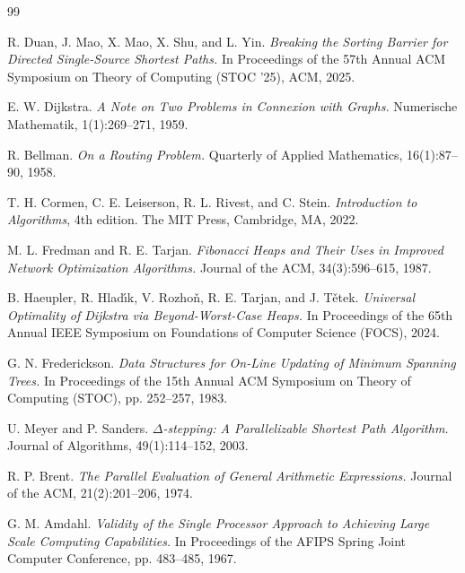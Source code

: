 \documentclass[12pt,a4paper,openany,oneside]{report}
\theoremstyle{plain}
\numberwithin{equation}{section}
\begin{document}
\newpage
{}
\begin{thebibliography}{99}

R. Duan, J. Mao, X. Mao, X. Shu, and L. Yin.
\textit{Breaking the Sorting Barrier for Directed Single-Source Shortest Paths.}
In Proceedings of the 57th Annual ACM Symposium on Theory of Computing (STOC '25), ACM, 2025.

E. W. Dijkstra.
\textit{A Note on Two Problems in Connexion with Graphs.}
Numerische Mathematik, 1(1):269--271, 1959.

R. Bellman.
\textit{On a Routing Problem.}
Quarterly of Applied Mathematics, 16(1):87--90, 1958.

T. H. Cormen, C. E. Leiserson, R. L. Rivest, and C. Stein.
\textit{Introduction to Algorithms}, 4th edition.
The MIT Press, Cambridge, MA, 2022.

M. L. Fredman and R. E. Tarjan.
\textit{Fibonacci Heaps and Their Uses in Improved Network Optimization Algorithms.}
Journal of the ACM, 34(3):596--615, 1987.

B. Haeupler, R. Hlad{\'\i}k, V. Rozho{\v{n}}, R. E. Tarjan, and J. T{\v{e}}tek.
\textit{Universal Optimality of Dijkstra via Beyond-Worst-Case Heaps.}
In Proceedings of the 65th Annual IEEE Symposium on Foundations of Computer Science (FOCS), 2024.

G. N. Frederickson.
\textit{Data Structures for On-Line Updating of Minimum Spanning Trees.}
In Proceedings of the 15th Annual ACM Symposium on Theory of Computing (STOC), pp. 252--257, 1983.

U. Meyer and P. Sanders.
\textit{$\Delta$-stepping: A Parallelizable Shortest Path Algorithm.}
Journal of Algorithms, 49(1):114--152, 2003.

R. P. Brent.
\textit{The Parallel Evaluation of General Arithmetic Expressions.}
Journal of the ACM, 21(2):201--206, 1974.

G. M. Amdahl.
\textit{Validity of the Single Processor Approach to Achieving Large Scale Computing Capabilities.}
In Proceedings of the AFIPS Spring Joint Computer Conference, pp. 483--485, 1967.


\end{thebibliography}
\end{document}
